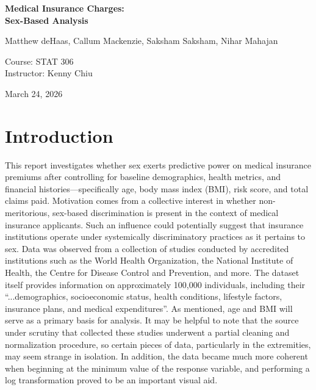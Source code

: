\documentclass[12pt, a4paper]{article}
\begin{document}
\begin{titlepage}
  \centering
  \vspace*{2cm}

  {\LARGE\bfseries Medical Insurance Charges:\\[0.4em]
  Sex-Based Analysis}

  \vspace{1.5cm}

	{\large Matthew deHaas, Callum Mackenzie, Saksham Saksham, Nihar Mahajan}

  \vspace{1.5cm}

  {\normalsize {Course: STAT 306}}\\[0.4em]
  {\normalsize Instructor: Kenny Chiu}

  \vfill

  {\normalsize March 24, 2026}

  \vspace{1cm}
\end{titlepage}

\section{Introduction}

This report investigates whether sex exerts predictive power on medical insurance premiums after controlling for baseline demographics, health metrics, and financial histories—specifically age, body mass index (BMI), risk score, and total claims paid. Motivation comes from a collective interest in whether non-meritorious, sex-based discrimination is present in the context of medical insurance applicants. Such an influence could potentially suggest that insurance institutions operate under systemically discriminatory practices as it pertains to sex. Data was observed from a collection of studies conducted by accredited institutions such as the World Health Organization, the National Institute of Health, the Centre for Disease Control and Prevention, and more. The dataset itself provides information on approximately 100,000 individuals, including their “...demographics, socioeconomic status, health conditions, lifestyle factors, insurance plans, and medical expenditures”. As mentioned, age and BMI will serve as a primary basis for analysis. It may be helpful to note that the source under scrutiny that collected these studies underwent a partial cleaning and normalization procedure, so certain pieces of data, particularly in the extremities, may seem strange in isolation. In addition, the data became much more coherent when beginning at the minimum value of the response variable, and performing a log transformation proved to be an important visual aid.
\end{document}
